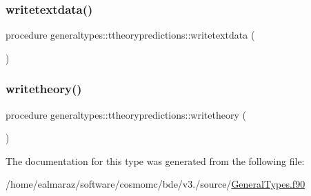 \mbox{\label{structgeneraltypes_1_1ttheorypredictions_aa66feb74aae3d343a5474c0b2183c7e5}} 
\subsubsection{\texorpdfstring{writetextdata()}{writetextdata()}}
{\footnotesize\ttfamily procedure generaltypes\+::ttheorypredictions\+::writetextdata (\begin{DoxyParamCaption}{ }\end{DoxyParamCaption})\hspace{0.3cm}{\ttfamily [private]}}

\mbox{\label{structgeneraltypes_1_1ttheorypredictions_ac81b8848faec0fdaf6776019484de1c7}} 
\subsubsection{\texorpdfstring{writetheory()}{writetheory()}}
{\footnotesize\ttfamily procedure generaltypes\+::ttheorypredictions\+::writetheory (\begin{DoxyParamCaption}{ }\end{DoxyParamCaption})\hspace{0.3cm}{\ttfamily [private]}}



The documentation for this type was generated from the following file\+:\begin{DoxyCompactItemize}
\item 
/home/ealmaraz/software/cosmomc/bde/v3./source/\mbox{\hyperlink{GeneralTypes_8f90}{General\+Types.\+f90}}\end{DoxyCompactItemize}

